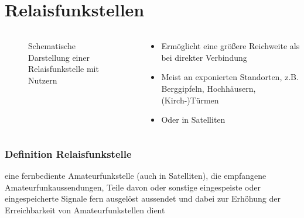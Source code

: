 
\section{Relaisfunkstellen}
\label{section:relaisfunkstellen}
\begin{frame}%

\begin{columns}
    \begin{column}{0.48\textwidth}
    
\begin{figure}
    \caption{\scriptsize Schematische Darstellung einer Relaisfunkstelle mit Nutzern}
    \label{n_relaisfunkstellen_aufbau}
\end{figure}


    \end{column}
   \begin{column}{0.48\textwidth}
       \begin{itemize}
  \item Ermöglicht eine größere Reichweite als bei direkter Verbindung
  \item Meist an exponierten Standorten, z.B. Berggipfeln, Hochhäusern, (Kirch-)Türmen
  \item Oder in Satelliten
  \end{itemize}

   \end{column}
\end{columns}

\end{frame}

\begin{frame}
\frametitle{Definition Relaisfunkstelle}
eine fernbediente Amateurfunkstelle (auch in Satelliten), die empfangene Amateurfunkaussendungen, Teile davon oder sonstige eingespeiste oder eingespeicherte Signale fern ausgelöst aussendet und dabei zur Erhöhung der Erreichbarkeit von Amateurfunkstellen dient

\end{frame}

